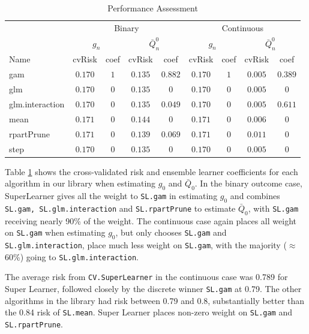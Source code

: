 \documentclass[english, 12pt]{article}
\begin{document}
\begin{table}
    \centering
    \begin{tabular}{lcccccccc}
\toprule
 & \multicolumn{4}{c}{Binary} & \multicolumn{4}{c}{Continuous} \\
 \cmidrule(lr){2-5}\cmidrule(lr){6-9}
 & \multicolumn{2}{c}{$g_n$} & \multicolumn{2}{c}{$\bar{Q}_n^0$} & \multicolumn{2}{c}{$g_n$} &  \multicolumn{2}{c}{$\bar{Q}_n^0$} \\
 \cmidrule(lr){2-3}\cmidrule(lr){4-5}\cmidrule(lr){6-7}\cmidrule(lr){8-9}
Name  & cvRisk & coef & cvRisk & coef & cvRisk & coef & cvRisk & \multicolumn{1}{c}{coef} \\ 
\midrule
gam  & $0.170$ & $1$ & $0.135$ & $0.882$ & $0.170$ & $1$ & $0.005$ & $0.389$ \\
glm  & $0.170$ & $0$ & $0.135$ & $0$ & $0.170$ & $0$ & $0.005$ & $0$ \\
glm.interaction  & $0.170$ & $0$ & $0.135$ & $0.049$ & $0.170$ & $0$ & $0.005$ & $0.611$ \\
mean  & $0.171$ & $0$ & $0.144$ & $0$ & $0.171$ & $0$ & $0.006$ & $0$ \\
rpartPrune  & $0.171$ & $0$ & $0.139$ & $0.069$ & $0.171$ & $0$ & $0.011$ & $0$ \\
step  & $0.170$ & $0$ & $0.135$ & $0$ & $0.170$ & $0$ & $0.005$ & $0$ \\
\bottomrule 
\end{tabular}
    \caption{Performance Assessment}
    \label{tab:performance}
\end{table}

Table \ref{tab:performance} shows the cross-validated risk and ensemble learner coefficients for each algorithm in our library when estimating $g_0$ and $\bar{Q}_0$. In the binary outcome case, SuperLearner gives all the weight to \texttt{SL.gam} in estimating $g_0$ and combines \texttt{SL.gam, SL.glm.interaction} and \texttt{SL.rpartPrune} to estimate $\bar{Q}_0$, with \texttt{SL.gam} receiving nearly 90\% of the weight. The continuous case again places all weight on \texttt{SL.gam} when estimating $g_0$, but only chooses \texttt{SL.gam} and \texttt{SL.glm.interaction}, place much less weight on \texttt{SL.gam}, with the majority ($\approx$ 60\%) going to \texttt{SL.glm.interaction}.

The average risk from \texttt{CV.SuperLearner} in the continuous case was 0.789 for Super Learner, followed closely by the discrete winner \texttt{SL.gam} at 0.79. The other algorithms in the library had risk between 0.79 and 0.8, substantially better than the 0.84 risk of \texttt{SL.mean}. Super Learner places non-zero weight on \texttt{SL.gam} and \texttt{SL.rpartPrune}.
\end{document}
